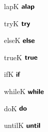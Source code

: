 \newcommand{\msp}{\;} %
\newcommand{\tick}{\surd}
\providecommand{\ltrace}{\ensuremath{[\![}}
\providecommand{\rtrace}{\ensuremath{]\!]}}
\providecommand{\sem}[1]{\ltrace{#1}\rtrace}
\newcommand{\semio}[1]{\sem{#1}_{\mathsf{io}}}
\newcommand{\semaut}[1]{\sem{#1}_{\mathsf{aut}}}

\newcommand{\keyword}[1]{%
    \expandafter\newcommand\csname #1K\endcsname
    {{\ensuremath{\textsf{\bfseries#1}}}}%
}
\keyword{alap}
\keyword{try}
\keyword{else}
\keyword{true}
\keyword{if}
\keyword{while}
\keyword{do}
\keyword{until}

\newcommand{\Lor}[2]{\ensuremath{{#1}|{#2}}}
\newcommand{\Lorr}[2]{\ensuremath{{#1}\mid\dotsc\mi{#2}}}
\newcommand{\Lseq}[2]{\ensuremath{{#1};{#2} }}
\newcommand{\Lrule}[1]{\ensuremath{\mathsf{#1}}}
\newcommand{\Ltrue}[0]{\trueK}
\newcommand{\Lstar}[1]{\ensuremath{{#1}*}}
\newcommand{\Lalap}[1]{\ensuremath{\alapK \msp #1}}
\newcommand{\Ldowhile}[2]{\ensuremath{\doK \msp #1 \msp \whileK \msp ( #2 )}}
\newcommand{\Lwhiledo}[2]{\ensuremath{while \msp ( #1 ) \msp do \msp #2 }}
\newcommand{\Lifskip}[2]{\ensuremath{if \msp ( #1 ) \msp #2 }}
\newcommand{\Lifelse}[3]{\ensuremath {if \msp ( #1 ) \msp #2 \msp else \msp #3 }}
\newcommand{\Ltryskip}[1] {\ensuremath{ try \msp #1 }}
\newcommand{\Ltryelse}[2] {\ensuremath{\tryK \msp #1 \msp \elseK \msp #2}}
\newcommand{\Lchoice}[3] {\ensuremath{ choice \msp #1 \msp or \msp #2 \msp ... \msp or \msp #2 }}

\newcommand{\alap}{{\downarrow}}
\newcommand{\tryelse}{\mathbin{?}}
\newcommand{\trace}[1] {\ensuremath{ \ltrace #1 \rtrace }}
\newcommand{\setof}[1] {\ensuremath{{\{ #1 \}}}}
\newcommand{\todo}[1] {({\tt TODO:} {\emph #1})}

%
\newcommand{\linefill}{%
    \cleaders
    \hbox{$\smash{\mkern-2mu\mathord-\mkern-2mu}$}%
    \hfill
    \vphantom{\lower1pt\hbox{$\rightarrow$}}%
}
\newcommand{\Linefill}{%
    \cleaders
    \hbox{$\smash{\mkern-2mu\mathord=\mkern-2mu}$}%
    \hfill
    \vphantom{\hbox{$\Rightarrow$}}%
}
\newcommand{\larrow}[0] {\ensuremath{\overset{\varepsilon}{\Rightarrow} }}

\newcommand{\xleftnoend}[1][]{\mathrel-_{\vphantom{#1}}\mkern-11mu}
\newcommand{\xLeftnoend}[1][]{\mathrel=_{\vphantom{#1}}\mkern-8mu}
\newcommand{\xleftArrow}[1][]{\leftarrow_{\vphantom{#1}}\mkern-11mu}
\newcommand{\xmid}[2][]{\stackrel{#2}{\linefill_{\vphantom{#1}}}}
\newcommand{\xMid}[2][]{\stackrel{#2}{\Linefill_{\vphantom{#1}}}}
\newcommand{\xrightnoend}[1][]{\mkern-11mu\mathrel-_{#1}}
\newcommand{\xrightArrow}[1][]{\mkern-11mu\rightarrow_{#1}}
\newcommand{\xRightArrow}[1][]{\mkern-8mu\Rightarrow_{#1}}
\newcommand{\xmake}[1]{\mathrel{\lower1pt\hbox{$#1$}}}

